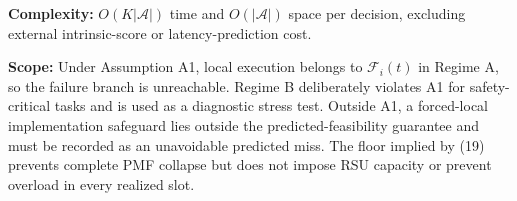 \documentclass[10pt]{article}
\begin{document}
\vspace{3pt}
\footnotesize
\textbf{Complexity:}
$O(K|\mathcal A|)$ time and $O(|\mathcal A|)$ space per decision,
excluding external intrinsic-score or latency-prediction cost.

\textbf{Scope:}
Under Assumption A1, local execution belongs to $\mathcal F_i(t)$ in Regime A,
so the failure branch is unreachable. Regime B deliberately violates A1 for
safety-critical tasks and is used as a diagnostic stress test. Outside A1, a
forced-local implementation safeguard lies outside the predicted-feasibility
guarantee and must be recorded as an unavoidable predicted miss. The floor
implied by (19) prevents complete PMF collapse but does not impose RSU capacity
or prevent overload in every realized slot.
\end{document}
